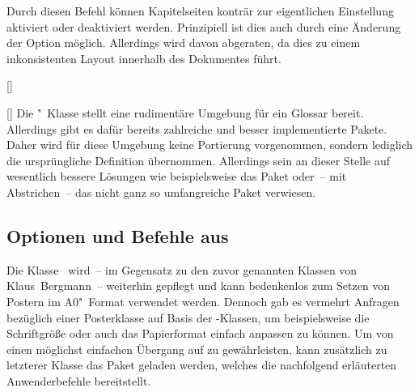 \begin{Entity*}{}
\begin{Declaration}{}
\printdeclarationlist%
%
Durch diesen Befehl können Kapitelseiten konträr zur eigentlichen Einstellung 
aktiviert oder deaktiviert werden. Prinzipiell ist dies auch durch eine 
Änderung der Option  möglich. Allerdings wird davon 
abgeraten, da dies zu einem inkonsistenten Layout innerhalb des Dokumentes 
führt.
\end{Declaration}

\begin{Declaration}{[]}
\begin{Declaration}{[]}
\printdeclarationlist%
%
Die "~Klasse stellt eine rudimentäre Umgebung für ein Glossar 
bereit. Allerdings gibt es dafür bereits zahlreiche und besser implementierte 
Pakete. Daher wird für diese Umgebung keine Portierung vorgenommen, sondern 
lediglich die ursprüngliche Definition übernommen. Allerdings sein an dieser 
Stelle auf wesentlich bessere Lösungen wie beispielsweise das Paket 
 oder~-- mit Abstrichen~-- das nicht ganz so umfangreiche 
Paket  verwiesen.
\end{Declaration}
\end{Declaration}
%



\subsection{%
  Optionen und Befehle aus %
}
%
Die Klasse~ wird~-- im Gegensatz zu den zuvor genannten 
Klassen von Klaus~Bergmann~-- weiterhin gepflegt und kann bedenkenlos zum 
Setzen von Postern im A0"~Format verwendet werden. Dennoch gab es vermehrt 
Anfragen bezüglich einer Posterklasse auf Basis der \TUDScript-Klassen, um 
beispielsweise die Schriftgröße oder auch das Papierformat einfach anpassen zu 
können. Um von  einen möglichst einfachen Übergang auf 
 zu gewährleisten, kann zusätzlich zu letzterer Klasse das 
Paket  geladen werden, welches die nachfolgend erläuterten 
Anwenderbefehle bereitstellt.


\end{Entity*}

